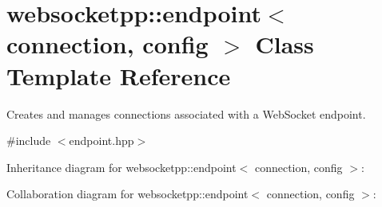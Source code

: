 \hypertarget{classwebsocketpp_1_1endpoint}{}\section{websocketpp\+:\+:endpoint$<$ connection, config $>$ Class Template Reference}
\label{classwebsocketpp_1_1endpoint}


Creates and manages connections associated with a Web\+Socket endpoint.  




{\ttfamily \#include $<$endpoint.\+hpp$>$}



Inheritance diagram for websocketpp\+:\+:endpoint$<$ connection, config $>$\+:


Collaboration diagram for websocketpp\+:\+:endpoint$<$ connection, config $>$\+:
